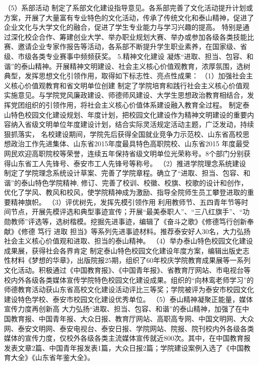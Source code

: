 （5）系部活动
制定了系部文化建设指导意见。各系部完善了文化活动提升计划或方案，开展了大量富有专业特色的文化活动，传承了传统文化和泰山精神，促进了企业文化与大学文化的融合，促进了学生专业能力与学习兴趣的提高。
特别是通过深化校企合作、筹建创业大学、举办职业规划大赛、举办或参加各级各类技能比赛、邀请企业专家作报告等活动，各系部不断提升学生职业素养，在国家级、省级、市级各类专业赛事中频频获奖。
5.精神文化建设
凝炼“进取、担当、包容、和谐”的泰山精神。开展精神文明建设、社会主义核心价值观教育，浓厚氛围，选树典型，发挥思想文化引领作用，取得如下标志性、亮点性成果：
（1）加强社会主义核心价值观教育和省文明单位创建
制定了学院培育和践行社会主义核心价值观实施意见。与学院党风廉政建设、师德师风建设、大学生思想政治教育相结合，发挥党团组织的引领作用，将社会主义核心价值体系建设融入教育全过程。
制定泰山特色校园文化建设规划、年度计划，把校园文化建设作为精神文明建设的重要内容纳入省级文明单位年度建设计划，结合实际灵活规定活动主题，广泛发动，持续狠抓落实，
名校建设期间，学院先后获得全国就业竞争力示范校、山东省高校思想政治工作先进集体、山东省2015年度最具特色高职院校、山东省2015 年度最受网民欢迎高职院校等荣誉，连续五年保持省级文明单位光荣称号。8个部门分别获得山东省工人先锋号、泰安市工人先锋号等称号。
（2）推进学院理念系统建设
制定了学院理念系统设计草案、完善了学院章程。确立了“进取、担当、包容、和谐”的泰山特色学院精神, 修订、完善了校训、校徽、校旗、校歌的设计和创作，优化了学风、教风和校风，使学院精神成为激励、指导全院师生员工攀登进取的重要精神旗帜。
（3）评优树先，发挥先模引领作用
利用教师节、五四青年节等时间节点，开展先模评选和典型事迹宣传；开展“最美泰职人”、“三八红旗手”、“功勋教师”评选等，选树楷模。挖掘先进事迹，编辑了《奋斗之歌》《修德笃行创新奉献》《修德 笃行 进取 担当》等系列先进事迹材料。推荐泰安好人30名，大力弘扬社会主义核心价值观和进取、担当的泰山精神。
（4）举办泰山特色校园文化建设成果展，获得社会各界肯定
制定泰山特色校园文化建设年度方案，编辑出版史志性材料《梦想的华章》，出版院报25期，组织了60年校庆学院教育成果展等一系列文化活动。积极通过《中国教育报》、《中国青年报》、省教育厅网站、市电视台等校内外各级各类媒体宣传学院特色校园文化建设成果。组织的“向林鸾老师学习”的师德教育活动获山东省高校文化建设活动评比三等奖；学院被评为泰安市校园文化建设特色学校、泰安市校园文化建设优秀单位。 
（5）泰山精神凝聚正能量，媒体宣传力度再创新高
大力弘扬“进取、担当、包容、和谐”的泰山精神，加强了在中国教育报、中国青年报、大众日报、教育厅网站、高职高专网、中国文明网、大众网、泰安文明网、泰安电视台、泰安日报、学院网站、院报、院刊校内外各级各类媒体的宣传力度，仅校外各级各类主流媒体宣传就近800次。其中，在中国教育报发表文章2篇、中国青年报发表1篇，大众日报2篇；学院建设案例入选了《中国教育大全》《山东省年鉴大全》。
